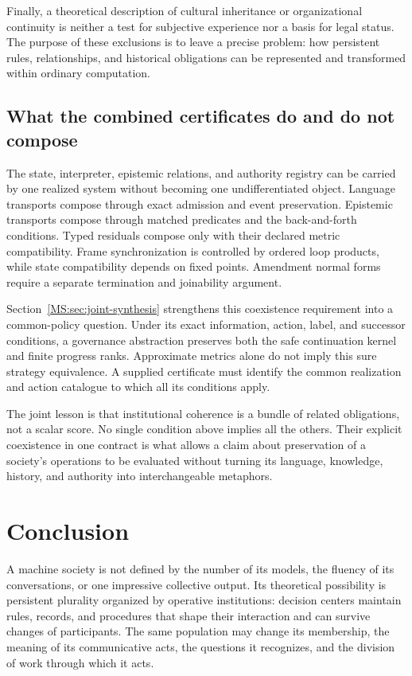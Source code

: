 Finally, a theoretical description of cultural inheritance or organizational continuity is neither a test for subjective experience nor a basis for legal status. The purpose of these exclusions is to leave a precise problem: how persistent rules, relationships, and historical obligations can be represented and transformed within ordinary computation.

\subsection{What the combined certificates do and do not compose}
The state, interpreter, epistemic relations, and authority registry can be carried by one realized system without becoming one undifferentiated object. Language transports compose through exact admission and event preservation. Epistemic transports compose through matched predicates and the back-and-forth conditions. Typed residuals compose only with their declared metric compatibility. Frame synchronization is controlled by ordered loop products, while state compatibility depends on fixed points. Amendment normal forms require a separate termination and joinability argument.

Section~\ref{MS:sec:joint-synthesis} strengthens this coexistence requirement into a common-policy question. Under its exact information, action, label, and successor conditions, a governance abstraction preserves both the safe continuation kernel and finite progress ranks. Approximate metrics alone do not imply this sure strategy equivalence. A supplied certificate must identify the common realization and action catalogue to which all its conditions apply.

The joint lesson is that institutional coherence is a bundle of related obligations, not a scalar score. No single condition above implies all the others. Their explicit coexistence in one contract is what allows a claim about preservation of a society's operations to be evaluated without turning its language, knowledge, history, and authority into interchangeable metaphors.

\section{Conclusion}\label{MS:sec:conclusion}
A machine society is not defined by the number of its models, the fluency of its conversations, or one impressive collective output. Its theoretical possibility is persistent plurality organized by operative institutions: decision centers maintain rules, records, and procedures that shape their interaction and can survive changes of participants. The same population may change its membership, the meaning of its communicative acts, the questions it recognizes, and the division of work through which it acts.

